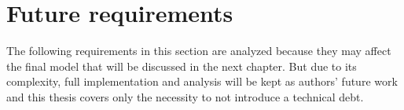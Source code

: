 





\section{Future requirements}

The following requirements in this section are analyzed because they may affect the final model that will be discussed in the next chapter. But due to its complexity, full implementation and analysis will be kept as authors' future work and this thesis covers only the necessity to not introduce a technical debt.







